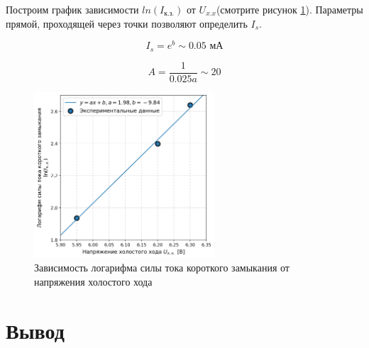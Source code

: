 \documentclass[a4paper, 12pt]{extarticle}
\begin{document}
Построим график зависимости $ln(I_{\text{к.з.}})$ от $U_{x.x}$(смотрите рисунок \ref{fig:line}). Параметры прямой, проходящей через точки позволяют определить $I_s$.

\begin{equation}
    I_{s} = e^{b} \sim 0.05 \text{ мА}
\end{equation}

\begin{equation}
    A = \frac{1}{0.025 a} \sim 20
\end{equation}


\begin{figure}[htbp]
    \centering
    \includegraphics[width = 0.6\textwidth]{pics/line.png}
    \caption{Зависимость логарифма силы тока короткого замыкания от напряжения холостого хода}
    \label{fig:line}
\end{figure}

\newpage
\section*{\textcolor{header}{Вывод}}
\end{document}
